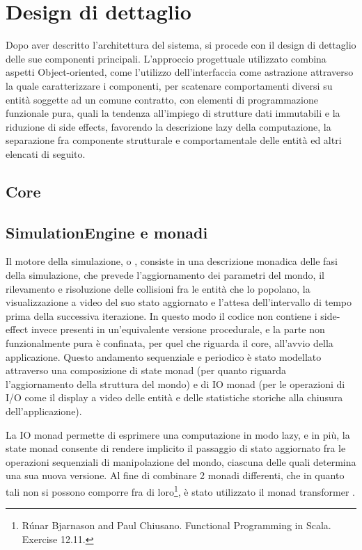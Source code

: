 \chapter{Design di dettaglio}

Dopo aver descritto l’architettura del sistema, si procede con il design di dettaglio delle sue componenti principali. 
L’approccio progettuale utilizzato combina aspetti Object-oriented, come l’utilizzo dell’interfaccia come astrazione attraverso la quale caratterizzare i componenti, per scatenare comportamenti diversi su entità soggette ad un comune contratto, con elementi di programmazione funzionale pura, quali la tendenza all’impiego di strutture dati immutabili e la riduzione di side effects, favorendo la descrizione lazy della computazione, la separazione fra componente strutturale e comportamentale delle entità ed altri elencati di seguito.


\section{Core}

\section{SimulationEngine e monadi}
Il motore della simulazione, o , consiste in una descrizione monadica delle fasi della simulazione, che prevede l’aggiornamento dei parametri del mondo, il rilevamento e risoluzione delle collisioni fra le entità che lo popolano, la visualizzazione a video del suo stato aggiornato e l’attesa dell’intervallo di tempo prima della successiva iterazione. In questo modo il codice non contiene i side-effect invece presenti in un’equivalente versione procedurale, e la parte non funzionalmente pura è confinata, per quel che riguarda il core, all’avvio della applicazione. 
Questo andamento sequenziale e periodico è stato modellato attraverso una composizione di state monad (per quanto riguarda l’aggiornamento della struttura del mondo) e di IO monad (per le operazioni di I/O come il display a video delle entità e delle statistiche storiche alla chiusura dell’applicazione).


La IO monad permette di esprimere una computazione in modo lazy, e in più, la state monad consente di rendere implicito il passaggio di stato aggiornato fra le operazioni sequenziali di manipolazione del mondo, ciascuna delle quali determina una sua nuova versione. Al fine di combinare 2 monadi differenti, che in quanto tali non si possono comporre fra di loro\footnote{Rúnar Bjarnason and Paul Chiusano. Functional Programming in Scala. Exercise 12.11.}, è stato utilizzato il monad transformer .

